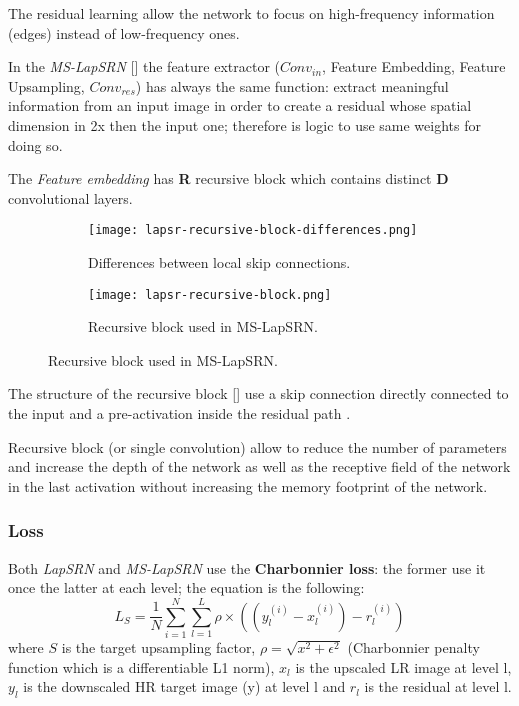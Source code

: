 The residual learning allow the network to focus on high-frequency information (edges) instead of low-frequency ones.

In the \textit{MS-LapSRN} [] the feature extractor ($Conv_{in}$, Feature Embedding, Feature Upsampling, $Conv_{res}$) has always the same function: extract meaningful information from an input image in order to create a residual whose spatial dimension in 2x then the input one; therefore is logic to use same weights for doing so.

The \textit{Feature embedding} has \textbf{R} recursive block \cite{DRCN} \cite{DRRN} which contains distinct \textbf{D} convolutional layers.

\begin{figure}
    \begin{subfigure}{0.49\textwidth}
        \centering
        \texttt{[image: lapsr-recursive-block-differences.png]}
        \caption{Differences between local skip connections.}            
    \end{subfigure}
    \begin{subfigure}{0.49\textwidth}
        \centering
        \texttt{[image: lapsr-recursive-block.png]}
        \caption{Recursive block used in MS-LapSRN.} \label{lapsrn:recursiveblock}
    \end{subfigure}
\end{figure}

The structure of the recursive block [] use a skip connection directly connected to the input and a pre-activation inside the residual path \cite{resnetidentity}.

Recursive block (or single convolution) allow to reduce the number of parameters and increase the depth of the network as well as the receptive field of the network in the last activation without increasing the memory footprint of the network. 


\subsubsection{Loss}
Both \textit{LapSRN} and \textit{MS-LapSRN} use the \textbf{Charbonnier loss}: the former use it once the latter at each level; the equation is the following:
$$
L_S = \frac{1}{N} \sum_{i=1}^{N}\sum_{l=1}^{L} \rho \times \left( \left( y_l^{(i)}-x_l^{(i)} \right) - r_l^{(i)} \right)
$$ where $S$ is the target upsampling factor, $\rho = \sqrt{x^2+\epsilon^2}$ (Charbonnier penalty function which is a differentiable L1 norm), $x_l$ is the upscaled LR image at level l, $y_l$ is the downscaled HR target image (y) at level l and $r_l$ is the residual at level l.

